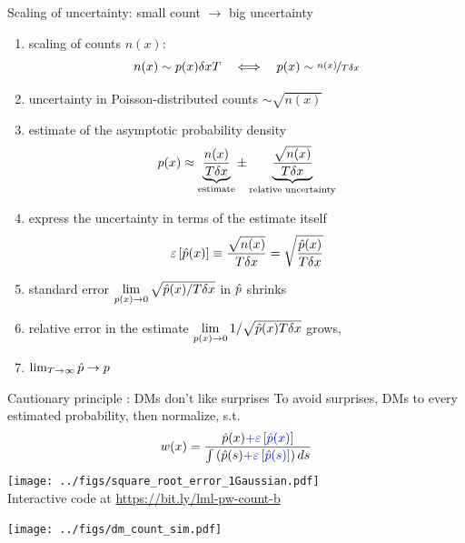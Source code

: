 \begin{frame}{Scaling of uncertainty: small count $\rightarrow$ big uncertainty}
\begin{enumerate}
  \item scaling of counts $n(x)$:
  	$$n(x) \sim p(x)\delta x T \quad \Longleftrightarrow \quad p(x) \sim \nicefrac{n(x)}{T\delta x}$$
  \item uncertainty in Poisson-distributed counts $\sim \sqrt{n(x)}$
  \item estimate of the asymptotic probability density
  \begin{equation}
    	p(x) \approx \underbrace{\frac{n(x)}{T\delta x}\strut}_{\text{estimate}} \pm \underbrace{\frac{\sqrt{n(x)}}{T\delta x}\mathstrut}_{\text{relative uncertainty}}
  \end{equation}
  \item express the uncertainty in terms of the estimate itself
  \begin{equation}
    \varepsilon\left[\hat{p}(x)\right]	\equiv \frac{\sqrt{n(x)}}{T \delta x} = \sqrt{\frac{\hat{p}(x)}{T\delta x}}
  \end{equation}
  \item standard error $ \lim\limits_{p(x) \to 0} \sqrt{\hat{p}(x)/T \delta x}$ in $\hat{p}$ shrinks
  \item relative error in the estimate $\lim\limits_{p(x) \to 0} 1/\sqrt{\hat{p}(x)T\delta x}$ grows,
  \item   $\lim_{T \to \infty} \hat{p} \to p$ 
  \hspace{2cm} 
\end{enumerate}
\end{frame}

\begin{frame}{Cautionary principle : DMs don't like surprises}
To avoid surprises, DMs  to every estimated probability, then normalize, s.t.
\begin{equation}
	w(x)=\frac{\hat{p}(x)\textcolor{blue}{+\varepsilon\left[\hat{p}(x)\right]}}{\int \left(\hat{p}(s) \textcolor{blue}{+\varepsilon\left[\hat{p}(s)\right]} \right)ds}
\end{equation}
\pause
\centering
	\texttt{[image: ../figs/square\_root\_error\_1Gaussian.pdf]} \\
	Interactive code at \url{https://bit.ly/lml-pw-count-b}
\end{frame}

\begin{frame}%
\begin{center}
	\texttt{[image: ../figs/dm\_count\_sim.pdf]}\\
\end{center}
\end{frame}

